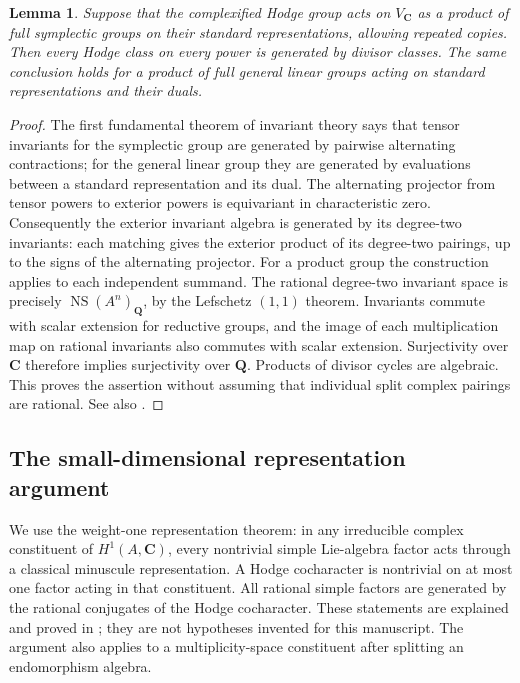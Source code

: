 \documentclass[10pt,reqno]{article}
\theoremstyle{emphasizedplain}
\theoremstyle{emphasizeddefinition}
\theoremstyle{emphasizeddefinition}
\newtheorem{prelemma}{Lemma}
\DeclareMathOperator{\NS}{NS}
\newcommand{\Q}{\mathbf Q}
\newcommand{\C}{\mathbf C}
\begin{document}
\begin{prelemma}\label{p:fft}
Suppose that the complexified Hodge group acts on $V_\C$ as a product of full
symplectic groups on their standard representations, allowing repeated
copies. Then every Hodge class on every power is generated by divisor
classes. The same conclusion holds for a product of full general linear
groups acting on standard representations and their duals.
\end{prelemma}
\begin{proof}
The first fundamental theorem of invariant theory says that tensor
invariants for the symplectic group are generated by pairwise alternating
contractions; for the general linear group they are generated by evaluations
between a standard representation and its dual. The alternating projector
from tensor powers to exterior powers is equivariant in characteristic zero.
Consequently the exterior invariant algebra is generated by its degree-two
invariants: each matching gives the exterior product of its degree-two
pairings, up to the signs of the alternating projector.
For a product group the construction applies to each independent summand.
The rational degree-two invariant space is precisely $\NS(A^n)_\Q$, by the
Lefschetz $(1,1)$ theorem. Invariants commute with scalar extension for
reductive groups, and the image of each multiplication map on rational
invariants also commutes with scalar extension. Surjectivity over $\C$
therefore implies surjectivity over $\Q$. Products of divisor cycles are
algebraic. This proves the assertion without assuming that individual split
complex pairings are rational. See also \cite[Theorem 2.14]{Moonen}.
\end{proof}

\subsection*{The small-dimensional representation argument}
We use the weight-one representation theorem: in any irreducible complex
constituent of $H^1(A,\C)$, every nontrivial simple Lie-algebra factor acts
through a classical minuscule representation. A Hodge cocharacter is
nontrivial on at most one factor acting in that constituent. All rational
simple factors are generated by the rational conjugates of the Hodge
cocharacter. These statements are explained and proved in
\cite[\S3, especially (3.9)--(3.13)]{Moonen}; they are not hypotheses invented
for this manuscript. The argument also applies to a multiplicity-space
constituent after splitting an endomorphism algebra.
\end{document}
